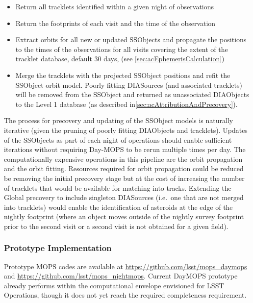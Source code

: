 \begin{itemize}
\item Return all tracklets identified within a given night of observations
\item Return the footprints of each visit and the time of the observation
\item Extract orbits for all new or updated SSObjects and propagate the positions to the times of the observations for all visits covering the extent of the tracklet database, default 30 days, (see \ref{sec:acEphemerisCalculation})
\item Merge the tracklets with the projected SSObject positions and refit the SSObject orbit model. Poorly fitting DIASources (and associated tracklets) will be removed from the SSObject and returned as unassociated DIAObjects to the Level 1 database (as described in\ref{sec:acAttributionAndPrecovery}).
\end{itemize}


The process for precovery and updating of the SSObject models is naturally iterative (given the pruning of poorly fitting DIAObjects and tracklets). Updates of the SSObjects as part of each night of operations should enable sufficient iterations without requiring Day-MOPS to be rerun multiple times per day. The computationally expensive operations in this pipeline are the orbit propagation and the orbit fitting. Resources required for orbit propagation could be reduced be removing the initial precovery stage but at the cost of increasing the number of tracklets that would be available for matching into tracks. Extending the Global precovery to include singleton DIASources (i.e.\ one that are not merged into tracklets) would enable the identification of asteroids at the edge of the nightly footprint (where an object moves outside of the nightly survey footprint prior to the second visit or a second visit is not obtained for a given field).

\subsubsection{Prototype Implementation}

Prototype MOPS codes are available at \url{https://github.com/lsst/mops_daymops} and \url{https://github.com/lsst/mops_nightmops}. Current DayMOPS prototype already performs within the computational envelope envisioned for LSST Operations, though it does not yet reach the required completeness requirement.


